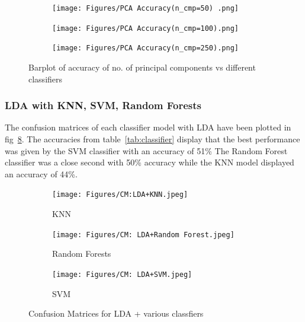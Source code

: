 \documentclass[a4paper]{article}
\theoremstyle{plain}
\theoremstyle{definition}
\begin{document}
{\begin{figure}[H]
\centering
\begin{subfigure}{0.31\textwidth} %
  \centering
  \texttt{[image: Figures/PCA Accuracy(n\_cmp=50) .png]}
  \label{fig:sub1}
\end{subfigure}%
\hfill %
\begin{subfigure}{0.31\textwidth} %
  \centering
  \texttt{[image: Figures/PCA Accuracy(n\_cmp=100).png]}
  \label{fig:sub2}
\end{subfigure}
\hfill
\begin{subfigure}{0.31\textwidth} %
  \centering
  \texttt{[image: Figures/PCA Accuracy(n\_cmp=250).png]}
  \label{fig:sub1}
\end{subfigure}%
\caption{Barplot of accuracy of no. of principal components vs different classifiers}
\label{fig:test2}
\end{figure}

\subsubsection {LDA with KNN, SVM, Random Forests}
The confusion matrices of each classifier model with LDA have been plotted in 
fig~\ref{fig:test3}. The accuracies from table~\ref{tab:classifier} display that the best performance was given by the SVM classifier with an accuracy of 51\% The Random Forest classifier was a close second with 50\% accuracy while the KNN model displayed an accuracy of 44\%.
\begin{figure}[H]
\centering
\begin{subfigure}{0.31\textwidth} %
  \centering
  \texttt{[image: Figures/CM:LDA+KNN.jpeg]}
  \caption{KNN}
  \label{fig:sub1}
\end{subfigure}%
\hfill %
\begin{subfigure}{0.31\textwidth} %
  \centering
  \texttt{[image: Figures/CM: LDA+Random Forest.jpeg]}
  \caption{Random Forests}
  \label{fig:sub2}
\end{subfigure}
\hfill
\begin{subfigure}{0.31\textwidth} %
  \centering
  \texttt{[image: Figures/CM: LDA+SVM.jpeg]}
  \caption{SVM}
  \label{fig:sub1}
\end{subfigure}%
\hfill %
\caption{Confusion Matrices for LDA + various classfiers}
\label{fig:test3}
\end{figure}

}
\end{document}
